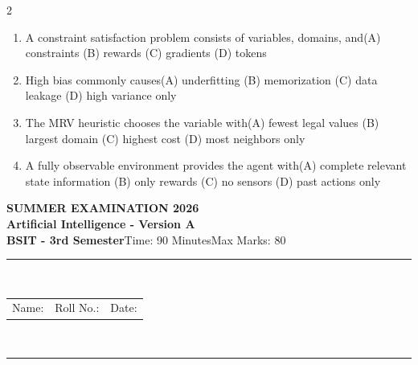 \documentclass[a4paper]{article}
\makeatletter
\newcommand{\examheader}{%
\begin{center}\textbf{\large SUMMER EXAMINATION 2026}\\[-1pt]
\textbf{\normalsize Artificial Intelligence - Version A}\\[-1pt]
\textbf{BSIT - 3rd Semester}\quad Time: 90 Minutes\quad Max Marks: 80\\[-1pt]
\textcolor{black!65}{\rule{\linewidth}{0.45pt}}\\[-2pt]
\begin{tabularx}{\linewidth}{@{}X X X@{}}Name: \hrulefill & Roll No.: \hrulefill & Date: \hrulefill\end{tabularx}\\[-1pt]
\textcolor{black!65}{\rule{\linewidth}{0.45pt}}\end{center}}
\makeatother
\begin{document}
\begin{multicols*}{2}
\begin{enumerate}
\item A constraint satisfaction problem consists of variables, domains, and\newline\hspace*{0.6em}(A) constraints \quad (B) rewards \newline\hspace*{0.6em}(C) gradients \quad (D) tokens
\item High bias commonly causes\newline\hspace*{0.6em}(A) underfitting \quad (B) memorization \newline\hspace*{0.6em}(C) data leakage \quad (D) high variance only
\item The MRV heuristic chooses the variable with\newline\hspace*{0.6em}(A) fewest legal values \quad (B) largest domain \newline\hspace*{0.6em}(C) highest cost \quad (D) most neighbors only
\item A fully observable environment provides the agent with\newline\hspace*{0.6em}(A) complete relevant state information \quad (B) only rewards \newline\hspace*{0.6em}(C) no sensors \quad (D) past actions only
\end{enumerate}
\end{multicols*}
\newpage
\examheader
\raggedcolumns
\end{document}

